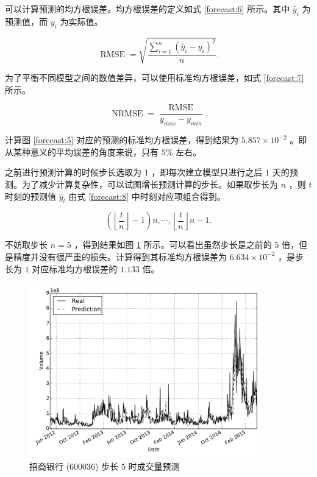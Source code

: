 可以计算预测的均方根误差。均方根误差的定义如式 \ref{forecast:6} 所示。其中 $\hat{y}_{i}$ 为预测值，而 $y_{i}$ 为实际值。

\begin{equation}
  \label{forecast:6}
  \operatorname{RMSE}=\sqrt{\frac{\sum_{i=1}^{n}(\hat{y}_{i}-y_{i})^{2}}{n}}.
\end{equation}

为了平衡不同模型之间的数值差异，可以使用标准均方根误差，如式 \ref{forecast:7} 所示。

\begin{equation}
  \label{forecast:7}
  \operatorname{NRMSE}=\frac{\operatorname{RMSE}}{y_{max}-y_{min}}.
\end{equation}

计算图 \ref{forecast:5} 对应的预测的标准均方根误差，得到结果为 $5.857\times 10^{-2}$ 。即从某种意义的平均误差的角度来说，只有 $5\%$ 左右。

之前进行预测计算的时候步长选取为 $1$ ，即每次建立模型只进行之后 $1$ 天的预测。为了减少计算复杂性，可以试图增长预测计算的步长。如果取步长为 $n$ ，则 $t$ 时刻的预测值 $\hat{y}_{t}$ 由式 \ref{forecast:8} 中时刻对应项组合得到。

\begin{equation}
  \label{forecast:8}
  \left (\left \lfloor \frac{t}{n}\right \rfloor -1\right )n,\cdots,\left \lfloor \frac{t}{n}\right \rfloor n-1.
\end{equation}

不妨取步长 $n=5$ ，得到结果如图 \ref{forecast:9} 所示。可以看出虽然步长是之前的 $5$ 倍，但是精度并没有很严重的损失。计算得到其标准均方根误差为 $6.634\times 10^{-2}$ ，是步长为 $1$ 对应标准均方根误差的 $1.133$ 倍。

\begin{figure}
  \centering
  \includegraphics[width=0.9\textwidth]{plots/var_forecast_regression_line_5_step.pdf}
  \caption{招商银行 (600036) 步长 $5$ 时成交量预测}
  \label{forecast:9}
\end{figure}

